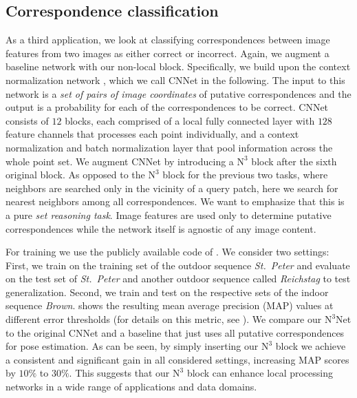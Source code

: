 \documentclass{article}
\newcommand\nnn{\text{N}^3}
\begin{document}
\subsection{Correspondence classification}
As a third application, we look at classifying correspondences between image features from two images as either correct or incorrect.
Again, we augment a baseline network with our non-local block.
Specifically, we build upon the context normalization network \cite{Yi:2018:LFG}, which we call CNNet in the following.
The input to this network is a \emph{set of pairs of image coordinates} of putative correspondences and the output is a probability for each of the correspondences to be correct.
CNNet consists of $12$ blocks, each comprised of a local fully connected layer with $128$ feature channels that processes each point individually, and a context normalization and batch normalization layer that pool information across the whole point set. 
We augment CNNet by introducing a $\nnn$ block after the sixth original block.
As opposed to the $\nnn$ block for the previous two tasks, where neighbors are searched only in the vicinity of a query patch, here we search for nearest neighbors among all correspondences.
We want to emphasize that this is a pure \emph{set reasoning task}.
Image features are used only to determine putative correspondences while the network itself is agnostic of any image content.

For training we use the publicly available code of \cite{Yi:2018:LFG}.
We consider two settings:
First, we train on the training set of the outdoor sequence \emph{St.~Peter} and evaluate on the test set of \emph{St.~Peter} and another outdoor sequence called \emph{Reichstag} to test generalization.
Second, we train and test on the respective sets of the indoor sequence \emph{Brown}.
 shows the resulting mean average precision (MAP) values at different error thresholds (for details on this metric, see \cite{Yi:2018:LFG}).
We compare our $\nnn$Net to the original CNNet and a baseline that just uses all putative correspondences for pose estimation.
As can be seen, by simply inserting our $\nnn$ block we achieve a consistent and significant gain in all considered settings, increasing MAP scores by $10\%$ to $30\%$.
This suggests that our $\nnn$ block can enhance local processing networks in a wide range of applications and data domains.
\end{document}
